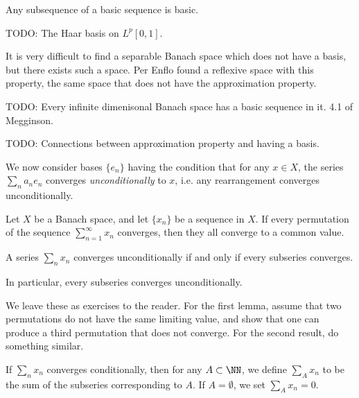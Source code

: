 \begin{corollary}
    Any subsequence of a basic sequence is basic.
\end{corollary}

\begin{example}
    TODO: The Haar basis on $L^p[0,1]$.
\end{example}

\begin{remark}
    It is very difficult to find a separable Banach space which does not have a basis, but there exists such a space. Per Enflo found a reflexive space with this property, the same space that does not have the approximation property.
\end{remark}

TODO: Every infinite dimenisonal Banach space has a basic sequence in it. 4.1 of Megginson.

TODO: Connections between approximation property and having a basis.

We now consider bases $\{ e_n \}$ having the condition that for any $x \in X$, the series $\sum_n a_n e_n$ converges \emph{unconditionally} to $x$, i.e. any rearrangement converges unconditionally.

\begin{lemma}
    Let $X$ be a Banach space, and let $\{ x_n \}$ be a sequence in $X$. If every permutation of the sequence $\sum_{n = 1}^\infty x_n$ converges, then they all converge to a common value.
\end{lemma}

\begin{lemma}
    A series $\sum_n x_n$ converges unconditionally if and only if every subseries converges.
\end{lemma}

\begin{remark}
    In particular, every subseries converges unconditionally.
\end{remark}

We leave these as exercises to the reader. For the first lemma, assume that two permutations do not have the same limiting value, and show that one can produce a third permutation that does not converge. For the second result, do something similar.

If $\sum_n x_n$ converges conditionally, then for any $A \subset \NN$, we define $\sum_A x_n$ to be the sum of the subseries corresponding to $A$. If $A = \emptyset$, we set $\sum_A x_n = 0$.

